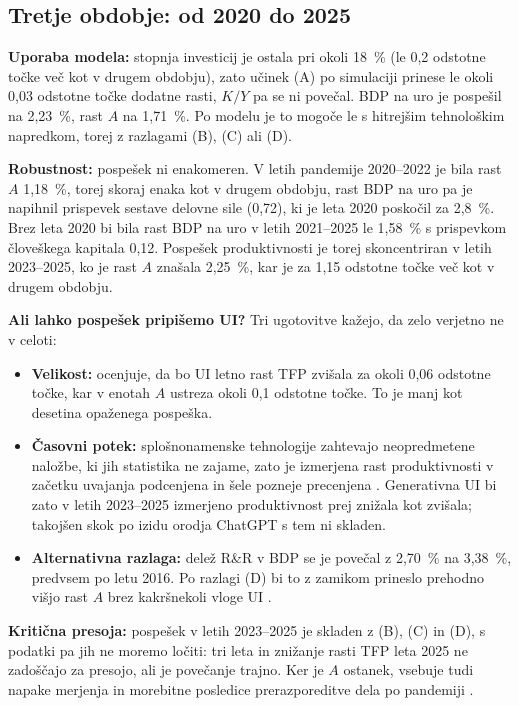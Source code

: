 \documentclass[12pt,a4paper]{article}
\begin{document}
\subsection{Tretje obdobje: od 2020 do 2025}
\textbf{Uporaba modela:} stopnja investicij je ostala pri okoli 18~\% (le 0,2 odstotne točke več kot v drugem obdobju), zato učinek (A) po simulaciji prinese le okoli 0,03 odstotne točke dodatne rasti, $K/Y$ pa se ni povečal. BDP na uro je pospešil na 2,23~\%, rast $A$ na 1,71~\%. Po modelu je to mogoče le s hitrejšim tehnološkim napredkom, torej z razlagami (B), (C) ali (D).

\textbf{Robustnost:} pospešek ni enakomeren. V letih pandemije 2020--2022 je bila rast $A$ 1,18~\%, torej skoraj enaka kot v drugem obdobju, rast BDP na uro pa je napihnil prispevek sestave delovne sile (0,72), ki je leta 2020 poskočil za 2,8~\%. Brez leta 2020 bi bila rast BDP na uro v letih 2021--2025 le 1,58~\% s prispevkom človeškega kapitala 0,12. Pospešek produktivnosti je torej skoncentriran v letih 2023--2025, ko je rast $A$ znašala 2,25~\%, kar je za 1,15 odstotne točke več kot v drugem obdobju.

\textbf{Ali lahko pospešek pripišemo UI?} Tri ugotovitve kažejo, da zelo verjetno ne v celoti:
\begin{itemize}
    \item \textbf{Velikost:} \textcite[29]{acemoglu2024} ocenjuje, da bo UI letno rast TFP zvišala za okoli 0,06 odstotne točke, kar v enotah $A$ ustreza okoli 0,1 odstotne točke. To je manj kot desetina opaženega pospeška.
    \item \textbf{Časovni potek:} splošnonamenske tehnologije zahtevajo neopredmetene naložbe, ki jih statistika ne zajame, zato je izmerjena rast produktivnosti v začetku uvajanja podcenjena in šele pozneje precenjena \parencite[3]{brynjolfsson2018}. Generativna UI bi zato v letih 2023--2025 izmerjeno produktivnost prej znižala kot zvišala; takojšen skok po izidu orodja ChatGPT s tem ni skladen.
    \item \textbf{Alternativna razlaga:} delež R\&R v BDP se je povečal z 2,70~\% na 3,38~\%, predvsem po letu 2016. Po razlagi (D) bi to z zamikom prineslo prehodno višjo rast $A$ brez kakršnekoli vloge UI \parencite{jones1995}.
\end{itemize}

\textbf{Kritična presoja:} pospešek v letih 2023--2025 je skladen z (B), (C) in (D), s podatki pa jih ne moremo ločiti: tri leta in znižanje rasti TFP leta 2025 ne zadoščajo za presojo, ali je povečanje trajno. Ker je $A$ ostanek, vsebuje tudi napake merjenja in morebitne posledice prerazporeditve dela po pandemiji \parencite[str.~23--24]{polanec_rast}.
\end{document}
